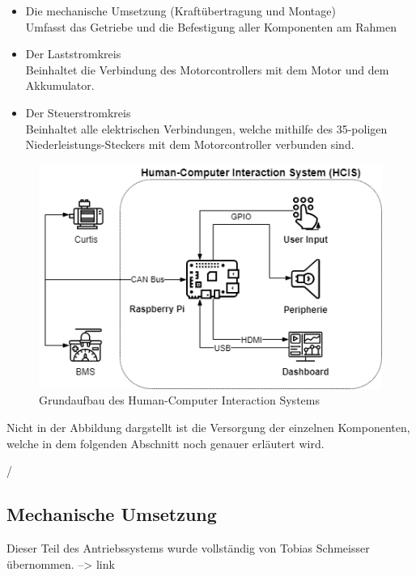 \begin{itemize}
	\item Die mechanische Umsetzung (Kraftübertragung und Montage) 
	\\ Umfasst das Getriebe und die Befestigung aller Komponenten am Rahmen
	\item Der Laststromkreis
	\\ Beinhaltet die Verbindung des Motorcontrollers mit dem Motor und dem Akkumulator.
	\item Der Steuerstromkreis
	\\ Beinhaltet alle elektrischen Verbindungen, welche mithilfe des 35-poligen
	\\ Niederleistungs-Steckers mit dem Motorcontroller verbunden sind.
\end{itemize}

\begin{figure}[H]
	\begin{center}
		\includegraphics[scale=0.5]{figures/hcis/HCIS_Grundfunktion.png}
		\caption{Grundaufbau des Human-Computer Interaction Systems}
	\end{center}
\end{figure}

Nicht in der Abbildung dargstellt ist die Versorgung der einzelnen Komponenten, welche in dem folgenden Abschnitt noch genauer erläutert wird.


/%

\newpage

\subsection{Mechanische Umsetzung}
Dieser Teil des Antriebssystems wurde vollständig von Tobias Schmeisser übernommen.
--> link

